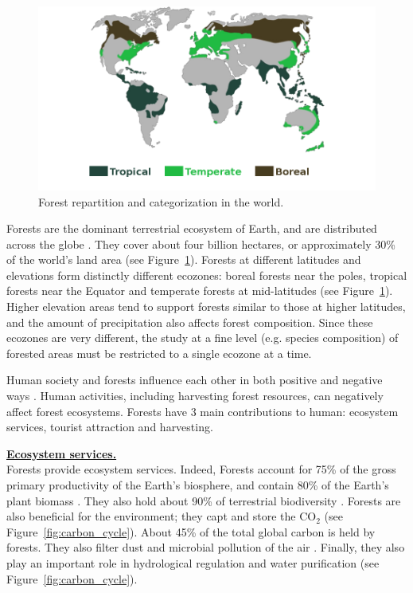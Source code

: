 \begin{figure}[htbp]
\begin{center}
\includegraphics[width=\textwidth]{Figures/forest_in_world.png}
\caption{Forest repartition and categorization in the world.}
\label{fig:forest_in_world}
\end{center}
\end{figure}

Forests are the dominant terrestrial ecosystem of Earth, and are distributed across the globe \citep{pan2013structure}. They cover about four billion hectares, or approximately 30\% of the world's land area (see Figure~\ref{fig:forest_in_world}). Forests at different latitudes and elevations form distinctly different ecozones: boreal forests near the poles, tropical forests near the Equator and temperate forests at mid-latitudes (see Figure~\ref{fig:forest_in_world}). Higher elevation areas tend to support forests similar to those at higher latitudes, and the amount of precipitation also affects forest composition. Since these ecozones are very different, the study at a fine level (e.g. species composition) of forested areas must be restricted to a single ecozone at a time.

Human society and forests influence each other in both positive and negative ways \citep{vogt2006global}. Human activities, including harvesting forest resources, can negatively affect forest ecosystems. Forests have 3 main contributions to human: ecosystem services, tourist attraction and harvesting.

\textbf{\underline{Ecosystem services.}}\\
Forests provide ecosystem services. Indeed, Forests account for 75\% of the gross primary productivity of the Earth's biosphere, and contain 80\% of the Earth's plant biomass \citep{pan2013structure}. They also hold about 90\% of terrestrial biodiversity \citep{brooks2006global, wasiq2004sustaining}. Forests are also beneficial for the environment; they capt and store the CO$_{2}$ \citep{fahey2010forest} (see Figure~\ref{fig:carbon_cycle}). About 45\% of the total global carbon is held by forests. They also filter dust and microbial pollution of the air \citep{smith2012air}. Finally, they also play an important role in hydrological regulation and water purification \citep{lempriere2008importance} (see Figure~\ref{fig:carbon_cycle}).


